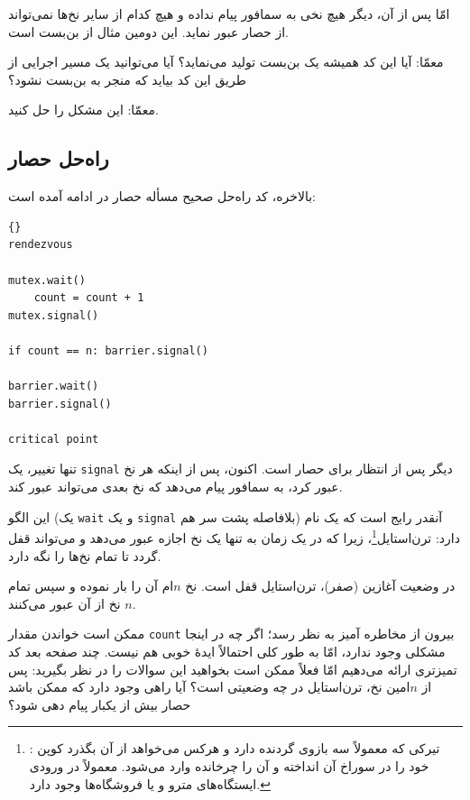 \documentclass{book}
\newcommand{\clearemptydoublepage}{\newpage\cleardoublepage}
\begin{document}
    امّا پس از آن، دیگر هیچ نخی به سمافور پیام نداده و هیچ کدام از سایر نخ‌ها نمی‌تواند از حصار عبور نماید. این دومین مثال از بن‌بست است. 
    
    معمّا: آیا این کد همیشه یک بن‌بست تولید می‌نماید؟ آیا می‌توانید یک مسیر اجرایی از طریق این کد بیاید که منجر به بن‌بست نشود؟ 
    
    معمّا: این مشکل را حل کنید. 


\clearemptydoublepage
\subsection{راه‌حل حصار}
\label{barrier}

    بالاخره، کد راه‌حل صحیح مسأله حصار در ادامه آمده است:	

\begin{latin}
\begin{lstlisting}[title=\rl{راه حل حصار}]{}
rendezvous

mutex.wait()
    count = count + 1
mutex.signal()

if count == n: barrier.signal()

barrier.wait()
barrier.signal()

critical point
\end{lstlisting}
\end{latin}

    تنها تغییر، یک \texttt{signal} دیگر پس از انتظار برای حصار است. 
    اکنون، پس از اینکه هر نخ عبور کرد، به سمافور پیام می‌دهد که نخ بعدی می‌تواند عبور کند. 


    این الگو (یک \texttt{wait} و یک \texttt{signal} بلافاصله پشت سر هم) آنقدر رایج است که یک نام دارد: ترن‌استایل\footnote{%
    : 
    تیرکی که معمولاً سه بازوی گردنده دارد و هرکس می‌خواهد از آن بگذرد کوپن خود را در سوراخ آن انداخته و آن‌ را چرخانده وارد می‌شود. 
    معمولاً در ورودی ایستگاه‌های مترو و یا فروشگاه‌ها وجود دارد.}، 
    زیرا که در یک زمان به تنها یک نخ اجازه عبور می‌دهد و می‌تواند قفل گردد تا تمام نخ‌ها را نگه دارد. 
    
    در وضعیت آغازین (صفر)، ترن‌استایل قفل است. نخ  $n$ام آن را بار نموده و سپس تمام  $n$ نخ از آن عبور می‌کنند. 

    ممکن است خواندن مقدار \texttt{count} بیرون از  مخاطره‌ آمیز به نظر رسد؛ اگر چه در اینجا مشکلی وجود ندارد،
    امّا به طور کلی احتمالاً ایدهٔ خوبی هم نیست. چند صفحه بعد کد تمیزتری ارائه می‌دهیم امّا فعلاً ممکن است بخواهید این سوالات را در نظر بگیرید:
    پس از $n$امین نخ، ترن‌استایل در چه وضعیتی است؟ آیا راهی وجود دارد که ممکن باشد حصار بیش از یکبار پیام دهی شود؟
\end{document}
